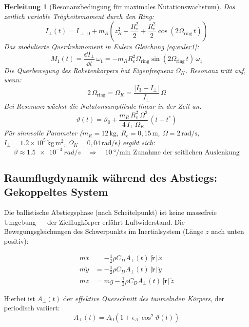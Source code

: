 ﻿\documentclass[12pt,a4paper]{article}
\newtheorem{herleitung}{Herleitung}[section]
\newcommand{\vek}[1]{\boldsymbol{#1}}
\begin{document}
\begin{herleitung}[Resonanzbedingung für maximales Nutationswachstum]
Das zeitlich variable Trägheitsmoment durch den Ring:
\[
  I_\perp(t) = I_{\perp,0} + m_R\left(z_R^2 + \frac{R_e^2}{2}
    + \frac{R_e^2}{2}\cos(2\Omega_{\mathrm{ring}}\,t)\right)
\]
Das modulierte Querdrehmoment in Eulers Gleichung \eqref{eq:euler1}:
\[
  M_1(t) = \frac{\dd I_\perp}{\dd t}\,\omega_1
  = -m_R R_e^2 \Omega_{\mathrm{ring}}\sin(2\Omega_{\mathrm{ring}}\,t)\,\omega_1
\]
Die Querbewegung des Raketenkörpers hat Eigenfrequenz $\Omega_K$.
Resonanz tritt auf, wenn:
\[
  \boxed{2\,\Omega_{\mathrm{ring}} = \Omega_K
  = \frac{|I_3 - I_\perp|}{I_\perp}\,\Omega}
\]
Bei Resonanz wächst die Nutatonsamplitude linear in der Zeit an:
\[
  \vartheta(t) = \vartheta_0 + \frac{m_R\,R_e^2\,\Omega^2}{4\,I_\perp\,\Omega_K}\,(t-t^*)
\]
Für sinnvolle Parameter ($m_R = 12\,\mathrm{kg}$, $R_e = 0{,}15\,\mathrm{m}$,
$\Omega = 2\,\mathrm{rad/s}$, $I_\perp = 1.2\times10^5\,\mathrm{kg\,m^2}$,
$\Omega_K = 0{,}04\,\mathrm{rad/s}$) ergibt sich:
\[
  \dot{\vartheta} \approx \SI{1.5e-3}{rad/s}
  \quad\Rightarrow\quad
  \SI{10}{\degree}/\text{min Zunahme der seitlichen Auslenkung}
\]
\end{herleitung}

\subsection{Raumflugdynamik während des Abstiegs: Gekoppeltes System}

Die ballistische Abstiegsphase (nach Scheitelpunkt) ist keine massefreie Umgebung ---
der Zielflugkörper erfährt Luftwiderstand. Die Bewegungsgleichungen des Schwerpunkts
im Inertialsystem (Länge $z$ nach unten positiv):

\begin{align}
  m\ddot{x} &= -\tfrac{1}{2}\rho C_D A_{\perp}(t)\,|\dot{\vek{r}}|\,\dot{x} \label{eq:traj_x}\\
  m\ddot{y} &= -\tfrac{1}{2}\rho C_D A_{\perp}(t)\,|\dot{\vek{r}}|\,\dot{y} \label{eq:traj_y}\\
  m\ddot{z} &= mg - \tfrac{1}{2}\rho C_D A_{\perp}(t)\,|\dot{\vek{r}}|\,\dot{z} \label{eq:traj_z}
\end{align}

Hierbei ist $A_{\perp}(t)$ der \emph{effektive Querschnitt des taumelnden Körpers},
der periodisch variiert:
\[
  A_{\perp}(t) = A_0\left(1 + \epsilon_A\,\cos^2\!\vartheta(t)\right)
\]
\end{document}

